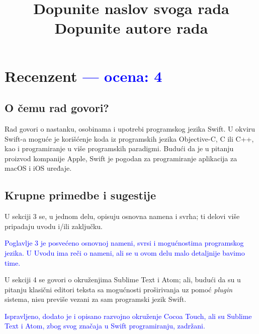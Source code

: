 \documentclass[a4paper]{report}
\newcommand{\odgovor}[1]{\textcolor{blue}{#1}}
\begin{document}
\title{Dopunite naslov svoga rada\\ \small{Dopunite autore rada}}

\maketitle

\tableofcontents


\chapter{Recenzent \odgovor{--- ocena: 4} }


\section{O čemu rad govori?}

Rad govori o nastanku, osobinama i upotrebi programskog jezika Swift. U okviru Swift-a moguće je korišćenje koda iz programskih jezika Objective-C, C ili C++, kao i programiranje u više programskih paradigmi. Budući da je u pitanju proizvod kompanije Apple, Swift je pogodan za programiranje aplikacija za macOS i iOS uređaje.

\section{Krupne primedbe i sugestije}

U sekciji 3 se, u jednom delu, opisuju osnovna namena i svrha; ti delovi više pripadaju uvodu i/ili zaključku.

\odgovor{Poglavlje 3 je posvećeno osnovnoj nameni, svrsi i mogućnostima programskog jezika. U Uvodu ima reči o nameni, ali se u ovom delu malo detaljnije bavimo time.}


U sekciji 4 se govori o okruženjima Sublime Text i Atom; ali, budući da su u pitanju klasični editori teksta sa mogućnosti proširivanja uz pomoć \textit{plugin} sistema, nisu previše vezani za sam programski jezik Swift.

\odgovor{Ispravljeno, dodato je i opisano razvojno okruženje Cocoa Touch, ali su Sublime Text i Atom, zbog svog značaja u Swift programiranju, zadržani.}
\end{document}
